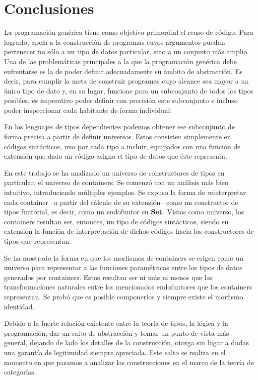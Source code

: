 \chapter*{Conclusiones}

La programación genérica tiene como objetivo primordial el reuso de código. Para lograrlo, apela a la construcción de programas cuyos argumentos puedan pertenecer no sólo a un tipo de datos particular, sino a un conjunto más amplio.   
Una de las problemáticas principales a la que la programación genérica debe enfrentarse es la de poder definir adecuadamente su ámbito de abstracción. Es decir, para cumplir la meta de construir programas cuyo alcance sea mayor a un único tipo de dato y, en su lugar, funcione para un subconjunto de todos los tipos posibles, es imperativo poder definir con precisión este subconjunto e incluso poder inspeccionar cada habitante de forma individual.

En los lenguajes de tipos dependientes podemos obtener ese subconjunto de forma precisa a partir de definir universos. Estos consisten simplemente en códigos sintácticos, uno por cada tipo a incluir, equipados con una función de extensión que dado un código asigna el tipo de datos que éste representa.

En este trabajo se ha analizado un universo de constructores de tipos en particular, el universo de containers. Se comenzó con un análisis más bien intuitivo, introduciendo múltiples ejemplos. Se expuso la forma de reinterpretar cada container --a partir del cálculo de su extensión-- como un constructor de tipos funtorial, es decir, como un endofuntor en $\mathbf{Set}$. Vistos como universo, los containers resultan ser, entonces, un tipo de códigos sintácticos, siendo su extensión la función de interpretación de dichos códigos hacia los constructores de tipos que representan.  

Se ha mostrado la forma en que los morfismos de containers se erigen como un universo para representar a las funciones paramétricas entre los tipos de datos generados por containers. Estos resultan ser ni más ni menos que las transformaciones naturales entre los mencionados endofuntores que los containers representan. Se probó que es posible componerlos y siempre existe el morfismo identidad.

Debido a la fuerte relación existente entre la teoría de tipos, la lógica y la programación, dar un salto de abstracción y tomar un punto de vista más general, dejando de lado los detalles de la construcción, otorga sin lugar a dudas una garantía de legitimidad siempre apreciada. Este salto se realiza en el momento en que pasamos a analizar las construcciones en el marco de la teoría de categorías.

